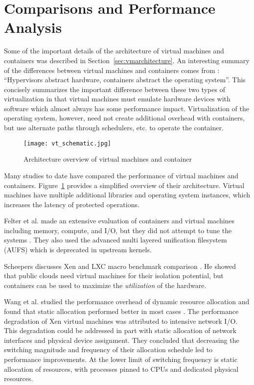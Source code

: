 
\section{Comparisons and Performance Analysis} %
\label{sec:comparisons_performance_analysis}
Some of the important details of the architecture of virtual machines and containers was described in Section~\ref{sec:vmarchitecture}.
An interesting summary of the differences between virtual machines and containers comes from \autocite{morabitohypervisors}: ``Hypervisors abstract hardware, containers abstract the operating system''. 
This concisely summarizes the important difference between these two types of virtualization in that virtual machines must emulate hardware devices with software which almost always has some performance impact.  
Virtualization of the operating system, however, need not create additional overhead with containers, but use alternate paths through schedulers, etc. to operate the container. 

\begin{figure}
    \centering
    \texttt{[image: vt\_schematic.jpg]}
    \caption{Architecture overview of virtual machines and container}
    \label{fig:vtschematic}
\end{figure}
Many studies to date have compared the performance of virtual machines and containers.
Figure~\ref{fig:vtschematic} provides a simplified overview of their architecture. 
Virtual machines have multiple additional libraries and operating system instances, which increases the latency of protected operations.  

Felter et al. made an extensive evaluation of containers and virtual machines including memory, compute, and I/O, but they did not attempt to tune the systems \autocite{_felter_1}.
They also used the advanced multi layered unification filesystem (AUFS) which is deprecated in upstream kernels.

Scheepers discusses Xen and LXC macro benchmark comparison \autocite{_scheepers_1}.  
He showed that public clouds need virtual machines for their isolation potential, but containers can be used to maximize the \emph{utilization} of the hardware.

Wang et al. studied the performance overhead of dynamic resource allocation and found that static allocation performed better in most cases \autocite{wangAllocation2007}.
The performance degradation of Xen virtual machines was attributed to intensive network I/O.
This degradation could be addressed in part with static allocation of network interfaces and physical device assignment.
They concluded that decreasing the switching magnitude and frequency of their allocation schedule led to performance improvements.
At the lower limit of switching frequency is static allocation of resources, with processes pinned to CPUs and dedicated physical resources.

